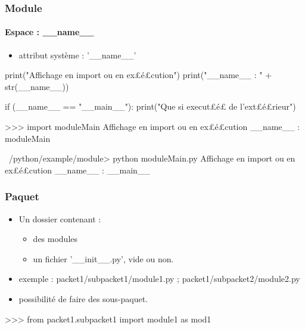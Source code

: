 \begin{frame}[fragile]
\frametitle{Module}
\framesubtitle{Espace : \_\_name\_\_}
\begin{itemize}
\item attribut système : '\_\_name\_\_'
\end{itemize}
\begin{python}
print("Affichage en import ou en ex£{\color{magenta}\'e}£cution")
print("__name__ : " + str(__name__))

if (__name__ == "__main__"): 
    print("Que si execut£{\color{magenta}\'e}£ de l'ext£{\color{magenta}\'e}£rieur")
\end{python}
\begin{pythonConsole}
>>> import moduleMain
Affichage en import ou en ex£\'e£cution
__name__ : moduleMain
\end{pythonConsole}
\begin{shell}
~/python/example/module> python moduleMain.py
Affichage en import ou en ex£é£cution
__name__ : __main__
\end{shell}
\end{frame}
\begin{frame}[fragile]
\frametitle{Paquet}
\begin{itemize}
 \item Un dossier contenant : 
 \begin{itemize} 
  \item des modules
  \item un fichier '\_\_init\_\_.py', vide ou non.
 \end{itemize}
 \item exemple : packet1/subpacket1/module1.py ; packet1/subpacket2/module2.py 
 \item possibilité de faire des sous-paquet.  
\end{itemize}
\begin{pythonConsole}
>>> from packet1.subpacket1 import module1 as mod1
\end{pythonConsole}
\begin{center}
\end{center}
\end{frame}
